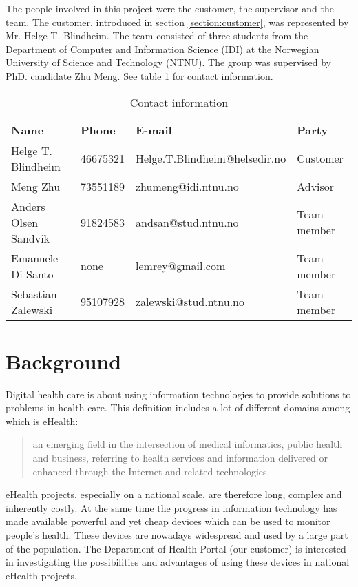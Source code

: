 The people involved in this project were the customer, the supervisor and the team.
The customer, introduced in section \ref{section:customer}, was represented by Mr. Helge T. Blindheim.
The team consisted of three students from the Department of Computer and Information Science (IDI) at the Norwegian University of Science and Technology (NTNU). The group was supervised by PhD. candidate Zhu Meng.
See table \ref{table:contact} for contact information.

\begin{table}[h]
\begin{center}
\begin{tabular}{ | l | l | l | p{2.5cm} | }
  \hline
  Name & Phone & E-mail & Party \\
  \hline\noalign{\smallskip}\hline
  Helge T. Blindheim	& 46675321		& Helge.T.Blindheim@helsedir.no		& Customer\\
  Meng Zhu				& 73551189		& zhumeng@idi.ntnu.no				& Advisor\\
  Anders Olsen Sandvik	& 91824583		& andsan@stud.ntnu.no				& Team member \\
  Emanuele Di Santo		& none			& lemrey@gmail.com					& Team member \\
  Sebastian Zalewski	& 95107928		& zalewski@stud.ntnu.no				& Team member \\
  \hline
\end{tabular}
\end{center}
\caption{Contact information}
\label{table:contact}
\end{table}

\section{Background}
\label{section:background}

Digital health care is about using information technologies to provide solutions to problems in health care.
This definition includes a lot of different domains among which is eHealth:
\begin{quote}
an emerging field in the intersection of medical informatics, public health and business, referring to health services
and information delivered or enhanced through the Internet and related technologies.\citep{ehealth}
\end{quote}
eHealth projects, especially on a national scale, are therefore long, complex and inherently costly.
At the same time the progress in information technology has made available powerful and yet cheap devices which
can be used to monitor people's health. These devices are nowadays widespread and used by a large part of the
population. The Department of Health Portal (our customer) is interested in investigating the
possibilities and advantages of using these devices in national eHealth projects.

